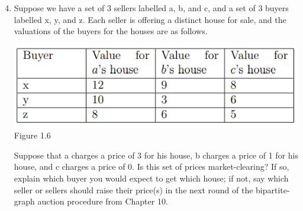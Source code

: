 \documentclass[11pt]{article}
\begin{document}
\begin{enumerate}
	\setcounter{enumi}{3}
	\item Suppose we have a set of 3 sellers labelled a, b, and c, and a set of 3 buyers labelled x, y, and z. Each seller is offering a distinct house for sale, and the valuations of the buyers for the houses are as follows.
	\begin{center}
		\includegraphics[scale=1.5]{Figure1.6}\\
		Figure 1.6
	\end{center}
Suppose that a charges a price of 3 for his house, b charges a price of 1 for his house, and c charges a price of 0. Is this set of prices market-clearing? If so, explain which buyer you would expect to get which house; if not, say which seller or sellers should raise their price(s) in the next round of the bipartite-graph auction procedure from Chapter 10.
\end{enumerate}
\end{document}
